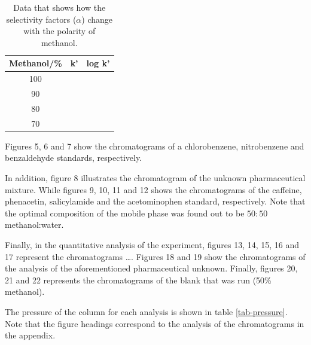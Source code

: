 \documentclass[a4paper, 12pt]{article}
\begin{document}
\begin{table}[h!]
	\centering
	\caption{Data that shows how the selectivity factors ($\alpha$) change with the polarity of methanol.}
	\begin{tabular}{|c|c|c|}
		\hline
		Methanol/\% & k' & log k' \\
		\hline
		100 & & \\
		\hline
		90 & & \\
		\hline
		80 & & \\
		\hline
		70 & & \\
		\hline
	\end{tabular}
	\label{tab-selectivity}
\end{table}

Figures 5, 6 and 7 show the chromatograms of a chlorobenzene, nitrobenzene and benzaldehyde standards, respectively.

In addition, figure 8 illustrates the chromatogram of the unknown pharmaceutical mixture. While figures 9, 10, 11 and 12 shows the chromatograms of the caffeine, phenacetin, salicylamide and the acetominophen standard, respectively. Note that the optimal composition of the mobile phase was found out to be $50:50$ methanol:water.

Finally, in the quantitative analysis of the experiment, figures 13, 14, 15, 16 and 17 represent the chromatograms \dots{}. Figures 18 and 19 show the chromatograms of the analysis of the aforementioned pharmaceutical unknown. Finally, figures 20, 21 and 22 represents the chromatograms of the blank that was run (50\% methanol).

The pressure of the column for each analysis is shown in table \ref{tab-pressure}. Note that the figure headings correspond to the analysis of the chromatograms in the appendix.
\end{document}
